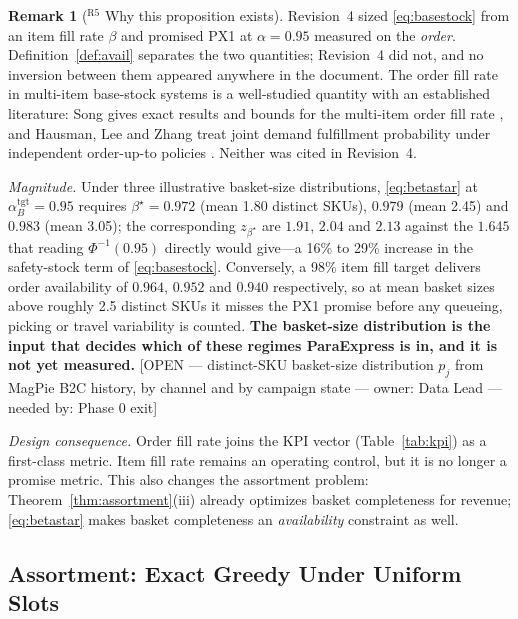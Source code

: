 \documentclass[10pt,twocolumn,letterpaper]{article}
\theoremstyle{definition}
\newtheorem{remark}{Remark}
\newcommand{\OPEN}[3]{{\color{openred}\footnotesize\textsf{[OPEN --- #1 --- owner: #2 --- needed by: #3]}}}
\begin{document}
\begin{remark}[$^{\mathrm{R5}}$ Why this proposition exists]
Revision~4 sized \eqref{eq:basestock} from an item fill rate $\beta$ and promised PX1 at $\alpha=0.95$ measured on the \emph{order}. Definition~\ref{def:avail} separates the two quantities; Revision~4 did not, and no inversion between them appeared anywhere in the document. The order fill rate in multi-item base-stock systems is a well-studied quantity with an established literature: Song gives exact results and bounds for the multi-item order fill rate \cite{song1998}, and Hausman, Lee and Zhang treat joint demand fulfillment probability under independent order-up-to policies \cite{hausman1998}. Neither was cited in Revision~4.

\emph{Magnitude.} Under three illustrative basket-size distributions, \eqref{eq:betastar} at $\alpha_B^{\mathrm{tgt}}=0.95$ requires $\beta^\star=0.972$ (mean 1.80 distinct SKUs), $0.979$ (mean 2.45) and $0.983$ (mean 3.05); the corresponding $z_{\beta^\star}$ are $1.91$, $2.04$ and $2.13$ against the $1.645$ that reading $\Phi^{-1}(0.95)$ directly would give---a 16\% to 29\% increase in the safety-stock term of \eqref{eq:basestock}. Conversely, a 98\% item fill target delivers order availability of $0.964$, $0.952$ and $0.940$ respectively, so at mean basket sizes above roughly 2.5 distinct SKUs it misses the PX1 promise before any queueing, picking or travel variability is counted. \textbf{The basket-size distribution is the input that decides which of these regimes ParaExpress is in, and it is not yet measured.} \OPEN{distinct-SKU basket-size distribution $p_j$ from MagPie B2C history, by channel and by campaign state}{Data Lead}{Phase 0 exit}

\emph{Design consequence.} Order fill rate joins the KPI vector (Table~\ref{tab:kpi}) as a first-class metric. Item fill rate remains an operating control, but it is no longer a promise metric. This also changes the assortment problem: Theorem~\ref{thm:assortment}(iii) already optimizes basket completeness for revenue; \eqref{eq:betastar} makes basket completeness an \emph{availability} constraint as well.
\end{remark}

\subsection{Assortment: Exact Greedy Under Uniform Slots}
\end{document}
